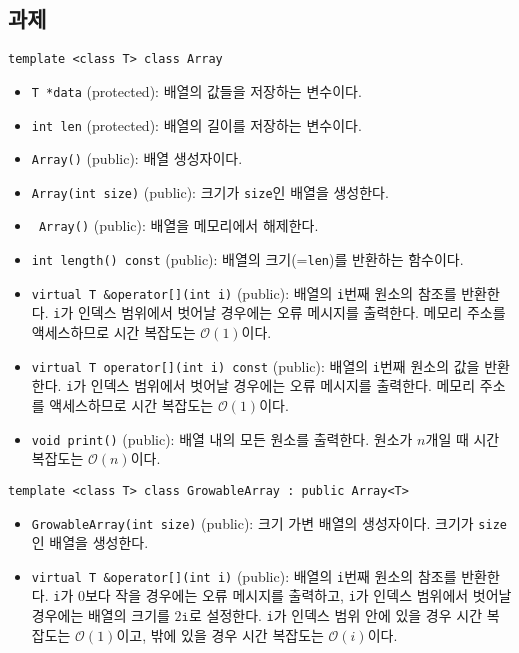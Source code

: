 \subsection{과제}

\texttt{template <class T> class Array}
\begin{itemize}
	\item \texttt{T *data} (protected): 배열의 값들을 저장하는 변수이다.
	\item \texttt{int len} (protected): 배열의 길이를 저장하는 변수이다.
	\item \texttt{Array(){}} (public): 배열 생성자이다.
	\item \texttt{Array(int size)} (public): 크기가 \texttt{size}인 배열을 생성한다.
	\item \texttt{~Array()} (public): 배열을 메모리에서 해제한다.
	\item \texttt{int length() const} (public): 배열의 크기(=\texttt{len})를 반환하는 함수이다.
	\item \texttt{virtual T &operator[](int i)} (public): 배열의 \texttt{i}번째 원소의 참조를 반환한다.
	\texttt{i}가 인덱스 범위에서 벗어날 경우에는 오류 메시지를 출력한다.
	메모리 주소를 액세스하므로 시간 복잡도는 $\mathcal{O}\left(1\right)$이다.
	\item \texttt{virtual T operator[](int i) const} (public): 배열의 \texttt{i}번째 원소의 값을 반환한다.
	\texttt{i}가 인덱스 범위에서 벗어날 경우에는 오류 메시지를 출력한다.
	메모리 주소를 액세스하므로 시간 복잡도는 $\mathcal{O}\left(1\right)$이다.
	\item \texttt{void print()} (public): 배열 내의 모든 원소를 출력한다.
	원소가 $n$개일 때 시간 복잡도는 $\mathcal{O}\left(n\right)$이다.
\end{itemize}

\texttt{template <class T> class GrowableArray : public Array<T>}
\begin{itemize}
	\item \texttt{GrowableArray(int size)} (public): 크기 가변 배열의 생성자이다. 크기가 \texttt{size}인 배열을 생성한다.
	\item \texttt{virtual T &operator[](int i)} (public): 배열의 \texttt{i}번째 원소의 참조를 반환한다.
	\texttt{i}가 0보다 작을 경우에는 오류 메시지를 출력하고, 
	\texttt{i}가 인덱스 범위에서 벗어날 경우에는 배열의 크기를 $2\texttt{i}$로 설정한다.
	\texttt{i}가 인덱스 범위 안에 있을 경우 시간 복잡도는 $\mathcal{O}\left(1\right)$이고, 밖에 있을 경우 시간 복잡도는 $\mathcal{O}\left(i\right)$이다.
\end{itemize}


